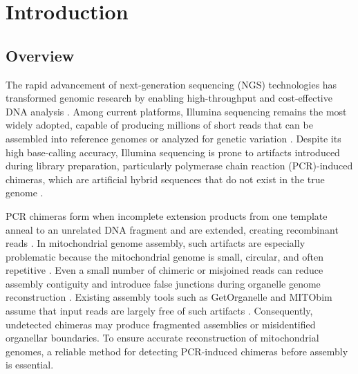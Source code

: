 
\chapter{Introduction}

\section{Overview}\label{subsec:overview}

The rapid advancement of next-generation sequencing (NGS) technologies has transformed genomic research by enabling high-throughput and cost-effective DNA analysis \citep{Metzker2010}. Among current platforms, Illumina sequencing remains the most widely adopted, capable of producing millions of short reads that can be assembled into reference genomes or analyzed for genetic variation \citep{Bentley2008,Glenn2011}. Despite its high base-calling accuracy, Illumina sequencing is prone to artifacts introduced during library preparation, particularly polymerase chain reaction (PCR)-induced chimeras, which are artificial hybrid sequences that do not exist in the true genome \citep{Judo1998}.

PCR chimeras form when incomplete extension products from one template anneal to an unrelated DNA fragment and are extended, creating recombinant reads \citep{Qiu2001}. In mitochondrial genome assembly, such artifacts are especially problematic because the mitochondrial genome is small, circular, and often repetitive \citep{Boore1999,Cameron2014}. Even a small number of chimeric or misjoined reads can reduce assembly contiguity and introduce false junctions during organelle genome reconstruction \citep{Hahn2013,Dierckxsens2017,Jin2020}. Existing assembly tools such as GetOrganelle and MITObim assume that input reads are largely free of such artifacts \citep{Hahn2013,Jin2020}. Consequently, undetected chimeras may produce fragmented assemblies or misidentified organellar boundaries. To ensure accurate reconstruction of mitochondrial genomes, a reliable method for detecting PCR-induced chimeras before assembly is essential.

